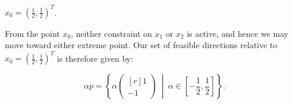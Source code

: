 $x_0 = \left( \frac{1}{2}, \frac{1}{2} \right)^T.$

\begin{solution}
  From the point $x_0$, neither constraint on $x_1$ or $x_2$ is active, and hence we may move toward either extreme 
  point. Our set of feasible directions relative to $x_0 = (\frac{1}{2}, \frac{1}{2})^T$ is therefore given by:

  $$
  \alpha p = \left\{ \alpha \begin{pmatrix*}[r] 1 \\ -1 \end{pmatrix*} \ \middle| \ \alpha \in \left[-\frac{1}{2}, \frac{1}{2}\right] \right\}.
  $$
  \ \\
\end{solution}